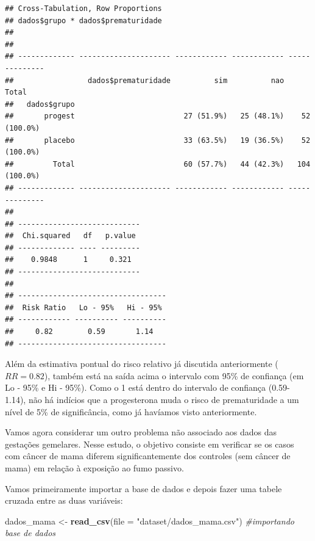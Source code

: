 \documentclass[
]{book}
\newenvironment{Shaded}{\begin{snugshade}}{\end{snugshade}}
\newcommand{\CommentTok}[1]{\textcolor[rgb]{0.56,0.35,0.01}{\textit{#1}}}
\newcommand{\DataTypeTok}[1]{\textcolor[rgb]{0.13,0.29,0.53}{#1}}
\newcommand{\KeywordTok}[1]{\textcolor[rgb]{0.13,0.29,0.53}{\textbf{#1}}}
\newcommand{\NormalTok}[1]{#1}
\newcommand{\StringTok}[1]{\textcolor[rgb]{0.31,0.60,0.02}{#1}}
\begin{document}
\begin{verbatim}
## Cross-Tabulation, Row Proportions  
## dados$grupo * dados$prematuridade  
## 
## 
## ------------- --------------------- ------------ ------------ --------------
##                 dados$prematuridade          sim          nao          Total
##   dados$grupo                                                               
##       progest                         27 (51.9%)   25 (48.1%)    52 (100.0%)
##       placebo                         33 (63.5%)   19 (36.5%)    52 (100.0%)
##         Total                         60 (57.7%)   44 (42.3%)   104 (100.0%)
## ------------- --------------------- ------------ ------------ --------------
## 
## ----------------------------
##  Chi.squared   df   p.value 
## ------------- ---- ---------
##    0.9848      1     0.321  
## ----------------------------
## 
## ----------------------------------
##  Risk Ratio   Lo - 95%   Hi - 95% 
## ------------ ---------- ----------
##     0.82        0.59       1.14   
## ----------------------------------
\end{verbatim}

Além da estimativa pontual do risco relativo já discutida anteriormente (\(RR=0.82\)), também está na saída acima o intervalo com 95\% de confiança (em Lo - 95\% e Hi - 95\%). Como o 1 está dentro do intervalo de confiança (0.59- 1.14), não há indícios que a progesterona muda o risco de prematuridade a um nível de 5\% de significância, como já havíamos visto anteriormente.

Vamos agora considerar um outro problema não associado aos dados das gestações gemelares. Nesse estudo, o objetivo consiste em verificar se os casos com câncer de mama diferem significantemente dos controles (sem câncer de mama) em relação à exposição ao fumo passivo.

Vamos primeiramente importar a base de dados e depois fazer uma tabele cruzada entre as duas variáveis:

\begin{Shaded}
\begin{Highlighting}[]
\NormalTok{dados_mama <-}\StringTok{ }\KeywordTok{read_csv}\NormalTok{(}\DataTypeTok{file =} \StringTok{"dataset/dados_mama.csv"}\NormalTok{) }\CommentTok{#importando base de dados}
\end{Highlighting}
\end{Shaded}
\end{document}
